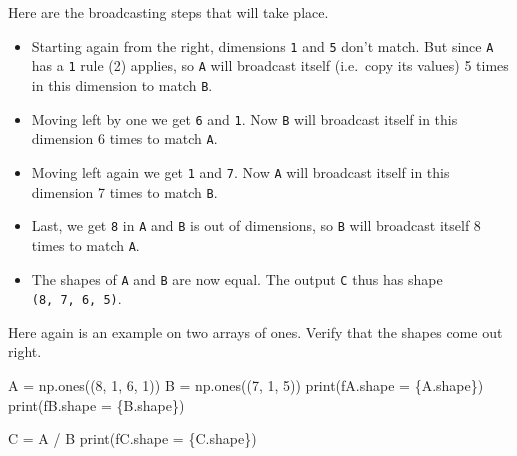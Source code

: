 \documentclass[
  letterpaper,
  DIV=11,
  numbers=noendperiod]{scrreprt}
\newenvironment{Shaded}{\begin{snugshade}}{\end{snugshade}}
\newcommand{\BuiltInTok}[1]{\textcolor[rgb]{0.00,0.23,0.31}{#1}}
\newcommand{\DecValTok}[1]{\textcolor[rgb]{0.68,0.00,0.00}{#1}}
\newcommand{\NormalTok}[1]{\textcolor[rgb]{0.00,0.23,0.31}{#1}}
\newcommand{\OperatorTok}[1]{\textcolor[rgb]{0.37,0.37,0.37}{#1}}
\newcommand{\SpecialCharTok}[1]{\textcolor[rgb]{0.37,0.37,0.37}{#1}}
\newcommand{\SpecialStringTok}[1]{\textcolor[rgb]{0.13,0.47,0.30}{#1}}
\providecommand{\tightlist}{%
  \setlength{\itemsep}{0pt}\setlength{\parskip}{0pt}}\usepackage{longtable,booktabs,array}
\begin{document}
Here are the broadcasting steps that will take place.

\begin{itemize}
\tightlist
\item
  Starting again from the right, dimensions \texttt{1} and \texttt{5}
  don't match. But since \texttt{A} has a \texttt{1} rule (2) applies,
  so \texttt{A} will broadcast itself (i.e.~copy its values) 5 times in
  this dimension to match \texttt{B}.
\item
  Moving left by one we get \texttt{6} and \texttt{1}. Now \texttt{B}
  will broadcast itself in this dimension 6 times to match \texttt{A}.
\item
  Moving left again we get \texttt{1} and \texttt{7}. Now \texttt{A}
  will broadcast itself in this dimension 7 times to match \texttt{B}.
\item
  Last, we get \texttt{8} in \texttt{A} and \texttt{B} is out of
  dimensions, so \texttt{B} will broadcast itself 8 times to match
  \texttt{A}.
\item
  The shapes of \texttt{A} and \texttt{B} are now equal. The output
  \texttt{C} thus has shape \texttt{(8,\ 7,\ 6,\ 5)}.
\end{itemize}

Here again is an example on two arrays of ones. Verify that the shapes
come out right.

\begin{Shaded}
\begin{Highlighting}[]
\NormalTok{A }\OperatorTok{=}\NormalTok{ np.ones((}\DecValTok{8}\NormalTok{, }\DecValTok{1}\NormalTok{, }\DecValTok{6}\NormalTok{, }\DecValTok{1}\NormalTok{))}
\NormalTok{B }\OperatorTok{=}\NormalTok{ np.ones((}\DecValTok{7}\NormalTok{, }\DecValTok{1}\NormalTok{, }\DecValTok{5}\NormalTok{))}
\BuiltInTok{print}\NormalTok{(}\SpecialStringTok{f\textquotesingle{}A.shape = }\SpecialCharTok{\{}\NormalTok{A}\SpecialCharTok{.}\NormalTok{shape}\SpecialCharTok{\}}\SpecialStringTok{\textquotesingle{}}\NormalTok{)}
\BuiltInTok{print}\NormalTok{(}\SpecialStringTok{f\textquotesingle{}B.shape = }\SpecialCharTok{\{}\NormalTok{B}\SpecialCharTok{.}\NormalTok{shape}\SpecialCharTok{\}}\SpecialStringTok{\textquotesingle{}}\NormalTok{)}

\NormalTok{C }\OperatorTok{=}\NormalTok{ A }\OperatorTok{/}\NormalTok{ B}
\BuiltInTok{print}\NormalTok{(}\SpecialStringTok{f\textquotesingle{}C.shape = }\SpecialCharTok{\{}\NormalTok{C}\SpecialCharTok{.}\NormalTok{shape}\SpecialCharTok{\}}\SpecialStringTok{\textquotesingle{}}\NormalTok{)}
\end{Highlighting}
\end{Shaded}
\end{document}
